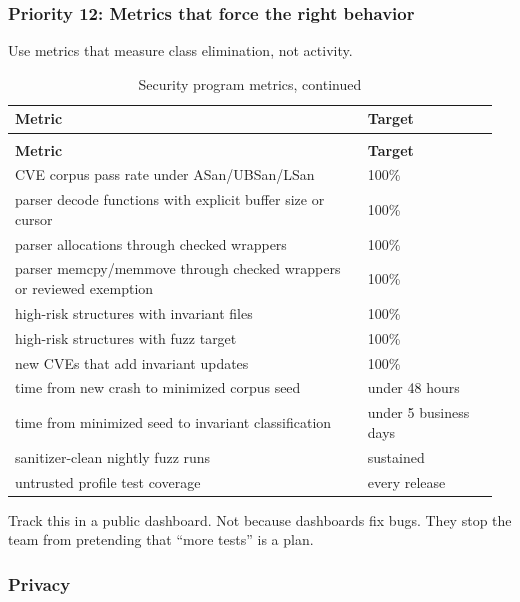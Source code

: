 \documentclass[../main.tex]{subfiles}
\begin{document}
\subsubsection*{Priority 12: Metrics that force the right behavior}

Use metrics that measure class elimination, not activity.

\begingroup
\small
\setlength{\tabcolsep}{3pt}
\renewcommand{\arraystretch}{1.15}

\begin{longtable}{@{}p{0.70\linewidth}p{0.26\linewidth}@{}}
\caption{Security program metrics}
\label{tab:security-program-metrics}\\
\hline
\textbf{Metric} & \textbf{Target} \\
\hline
\endfirsthead

\caption[]{Security program metrics, continued}\\
\hline
\textbf{Metric} & \textbf{Target} \\
\hline
\endhead

\hline
\endfoot

\hline
\endlastfoot

CVE corpus pass rate under ASan/UBSan/LSan & 100\% \\
parser decode functions with explicit buffer size or cursor & 100\% \\
parser allocations through checked wrappers & 100\% \\
parser memcpy/memmove through checked wrappers or reviewed exemption & 100\% \\
high-risk structures with invariant files & 100\% \\
high-risk structures with fuzz target & 100\% \\
new CVEs that add invariant updates & 100\% \\
time from new crash to minimized corpus seed & under 48 hours \\
time from minimized seed to invariant classification & under 5 business days \\
sanitizer-clean nightly fuzz runs & sustained \\
untrusted profile test coverage & every release \\
\end{longtable}
\endgroup

Track this in a public dashboard. Not because dashboards fix bugs. They stop the
team from pretending that “more tests” is a plan.

\subsubsection{Privacy}
\end{document}
